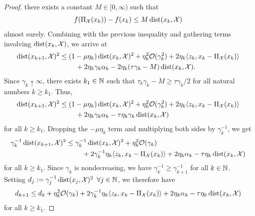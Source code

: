 \begin{proof}
    there exists a constant $M\in[0,\infty)$ such that
    \[
        f(\operatorname{\Pi_\mathcal{X}}(x_k)) - f(x_{k}) \leq M \operatorname{dist}(x_k, \mathcal{X})
    \]
    almost surely.
    Combining with the previous inequality and gathering terms involving $\operatorname{dist}(x_k,\mathcal{X})$,
    we arrive at
    \begin{align*}
        \operatorname{dist}(x_{k+1}, \mathcal{X})^2
        &\leq
        (1-\mu\eta_k)\operatorname{dist}(x_k, \mathcal{X})^2
            + \eta_k^2 \mathcal{O}(\gamma_k^2) + 2\eta_k\langle z_k, x_k - \operatorname{\Pi_\mathcal{X}}(x_k) \rangle \notag \\
            &\phantom{===}
                    + 2\eta_k\gamma_k\alpha_k
                    - 2\eta_k (\tau\gamma_k - M) \operatorname{dist}(x_k, \mathcal{X}).
    \end{align*}
    Since $\gamma_k \uparrow \infty$, there exists $k_1\in\mathbb{N}$ such that
    $\tau_k\gamma_k - M \geq \tau\gamma_k/2$ for all natural numbers $k\geq k_1$. Thus,
    \begin{align}
        \label{eq:proof:thm:upper-bound-on-f(xk)-f(xstar)-and-dist(xk)-convex-case:dist-bound}
        \operatorname{dist}(x_{k+1}, \mathcal{X})^2 &\leq
        (1-\mu\eta_k)\operatorname{dist}(x_k, \mathcal{X})^2 + \eta_k^2 \mathcal{O}(\gamma_k^2)
            + 2\eta_k\langle z_k, x_k - \operatorname{\Pi_\mathcal{X}}(x_k) \rangle \notag \\
            &\phantom{===}
            + 2\eta_k\gamma_k\alpha_k - \tau \eta_k\gamma_k \operatorname{dist}(x_k, \mathcal{X})
    \end{align}
    for all $k \geq k_1$.
    Dropping the $-\mu\eta_k$ term and 
    multiplying both sides by $\gamma_k^{-1}$, we get
    \begin{align*}
        \gamma_k^{-1} \operatorname{dist}(x_{k+1}, \mathcal{X})^2
        &\leq
        \gamma_k^{-1} \operatorname{dist}(x_k, \mathcal{X})^2
            + \eta_k^2\mathcal{O}(\gamma_k) \\
            &\phantom{===}
            + 2\gamma_k^{-1}\eta_k\langle z_k, x_k - \operatorname{\Pi_\mathcal{X}}(x_k) \rangle
            + 2\eta_k\alpha_k - \tau \eta_k \operatorname{dist}(x_k, \mathcal{X})
    \end{align*}
    for all $k \geq k_1$.
    Since $\gamma_k$ is nondecreasing, we have $\gamma_k^{-1} \geq \gamma_{k+1}^{-1}$ for all $k\in\mathbb{N}$.
    Setting $d_j := \gamma_j^{-1} \operatorname{dist}(x_j, \mathcal{X})^2 \enspace \forall j\in\mathbb{N}$, we therefore have
    \[
        d_{k+1}
        \leq
        d_k
            + \eta_k^2\mathcal{O}(\gamma_k)
            + 2\gamma_k^{-1}\eta_k\langle z_k, x_k - \operatorname{\Pi_\mathcal{X}}(x_k) \rangle
            + 2\eta_k\alpha_k
            - \tau \eta_k \operatorname{dist}(x_k, \mathcal{X})
    \]
    for all $k\geq k_1$.

\end{proof}
